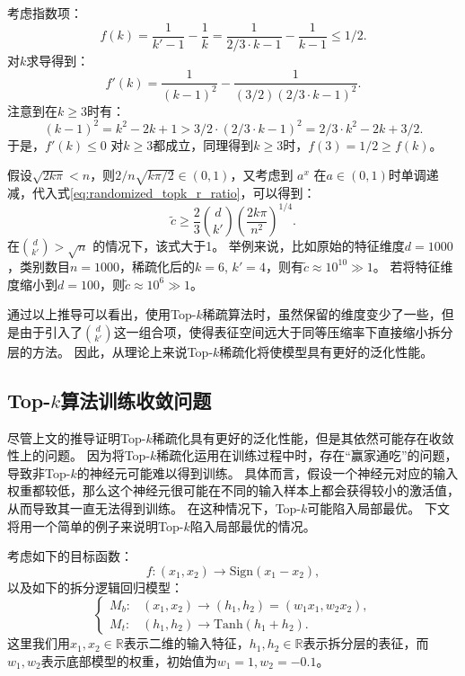 考虑指数项：
\begin{equation}
    f(k) = \dfrac{1}{k' - 1} - \dfrac{1}{k} = \dfrac{1}{2/3 \cdot k - 1} - \dfrac{1}{k - 1} \le 1/2.
\end{equation}
%
对$k$求导得到：
\begin{equation}
    f'(k) = \dfrac{1}{(k - 1)^2} - \dfrac{1}{(3/2)(2/3 \cdot k - 1)^2}.
\end{equation}
%
注意到在$k \ge 3$时有：
\begin{equation}
    (k - 1)^2 = k^2 - 2k + 1 > 3/2 \cdot (2/3\cdot k - 1)^2 = 2/3 \cdot k^2 -2k + 3/2.
\end{equation}
%
于是，$f'(k) \le 0$ 对$k \ge 3$都成立，同理得到$k \ge 3$时，$f(3) = 1/2 \ge f(k)$。
%



假设$\sqrt{2k\pi} < n$，则$2/n \sqrt{k\pi/2} \in (0, 1)$，又考虑到 $a^x$ 在$a \in (0, 1)$时单调递减，代入式\eqref{eq:randomized_topk_r_ratio}，可以得到：
\begin{equation}
    \tilde c \ge \dfrac23 {d \choose k'} \left(\dfrac{2k\pi}{n^2}\right)^{1/4}.
\end{equation}
%
在${d \choose k'} > \sqrt{n}$ 的情况下，该式大于1。
%
举例来说，比如原始的特征维度$d = 1000$，类别数目$n = 1000$，稀疏化后的$k = 6$, $k' = 4$，则有$\tilde c \approx 10^{10} \gg 1$。
%
若将特征维度缩小到$d = 100$，则$\tilde c \approx 10^6 \gg 1$。
%

通过以上推导可以看出，使用Top-$k$稀疏算法时，虽然保留的维度变少了一些，但是由于引入了${d \choose k'}$这一组合项，使得表征空间远大于同等压缩率下直接缩小拆分层的方法。
%
因此，从理论上来说Top-$k$稀疏化将使模型具有更好的泛化性能。
%


\subsection{Top-$k$算法训练收敛问题}
尽管上文的推导证明Top-$k$稀疏化具有更好的泛化性能，但是其依然可能存在收敛性上的问题。
因为将Top-$k$稀疏化运用在训练过程中时，存在“赢家通吃”的问题，导致非Top-$k$的神经元可能难以得到训练。
%
具体而言，假设一个神经元对应的输入权重都较低，那么这个神经元很可能在不同的输入样本上都会获得较小的激活值，从而导致其一直无法得到训练。
%
在这种情况下，Top-$k$可能陷入局部最优。
%
下文将用一个简单的例子来说明Top-$k$陷入局部最优的情况。

考虑如下的目标函数：
\begin{equation}
    f: (x_1, x_2) \to \text{Sign}(x_1 - x_2),
\end{equation}
以及如下的拆分逻辑回归模型：
\begin{equation}
\begin{cases}
    M_b: & (x_1, x_2) \to (h_1, h_2) = (w_1x_1, w_2x_2), \\
    M_t: & (h_1, h_2)\rightarrow \text{Tanh}(h_1 + h_2).
\end{cases}
\end{equation}
这里我们用$x_1, x_2 \in \mathbb R$表示二维的输入特征，$h_1, h_2 \in \mathbb R$表示拆分层的表征，而$w_1, w_2$表示底部模型的权重，初始值为$w_1 = 1, w_2 = -0.1$。


